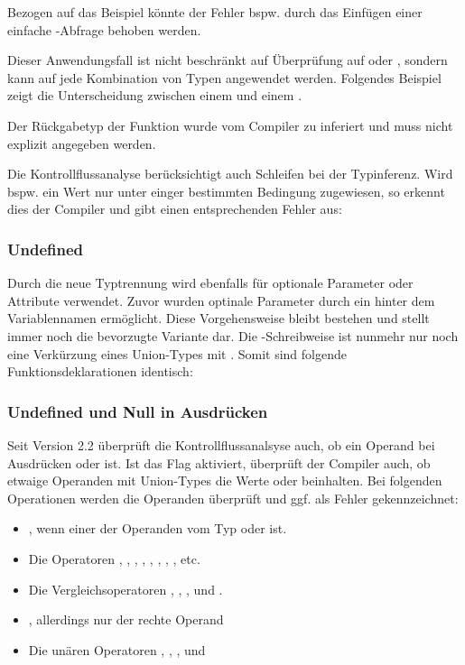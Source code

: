 Bezogen auf das Beispiel könnte der Fehler bspw. durch das Einfügen einer einfache -Abfrage behoben werden.


Dieser Anwendungsfall ist nicht beschränkt auf Überprüfung auf \tsnull oder \tsundefined, sondern kann auf jede Kombination von Typen angewendet werden. Folgendes Beispiel zeigt die Unterscheidung zwischen einem \tsstring und einem .


Der Rückgabetyp der Funktion  wurde vom Compiler zu \tsstring inferiert und muss nicht explizit angegeben werden.

Die Kontrollflussanalyse berücksichtigt auch Schleifen bei der Typinferenz. Wird bspw. ein Wert nur unter einger bestimmten Bedingung zugewiesen, so erkennt dies der Compiler und gibt einen entsprechenden Fehler aus:


\subsubsection{Undefined}
Durch die neue Typtrennung wird \tsundefined ebenfalls für optionale Parameter oder Attribute verwendet. Zuvor wurden optinale Parameter durch ein  hinter dem Variablennamen ermöglicht. Diese Vorgehensweise bleibt bestehen und stellt immer noch die bevorzugte Variante dar. Die -Schreib\-wei\-se ist nunmehr nur noch eine Verkürzung eines Union-Types mit \tsundefined. Somit sind folgende Funktionsdeklarationen identisch:


\subsubsection{Undefined und Null in Ausdrücken}
Seit Version 2.2 überprüft die Kontrollflussanalsyse auch, ob ein Operand bei Ausdrücken \tsnull oder \tsundefined ist. Ist das Flag  aktiviert, überprüft der Compiler auch, ob etwaige Operanden mit Union-Types die Werte \tsnull oder \tsundefined beinhalten. Bei folgenden Operationen werden die Operanden überprüft und ggf. als Fehler gekennzeichnet:
\begin{itemize}
\item \tsin{+}, wenn einer der Operanden vom Typ \tsany oder \tsstring ist.
\item Die Operatoren \tsin{-}, \tsin{*}, \tsin{**}, \tsin{<<}, \tsin{>>}, \tsin{>>>}, \tsin{&}, \tsin{|}, \tsin{^} etc.
\item Die Vergleichsoperatoren \tsin{<}, \tsin{>}, \tsin{<=}, \tsin{>=} und .
\item {}, allerdings nur der rechte Operand
\item Die unären Operatoren \tsin{+}, \tsin{-}, \tsin{~}, \tsin{++} und \tsin{--}
\end{itemize}

